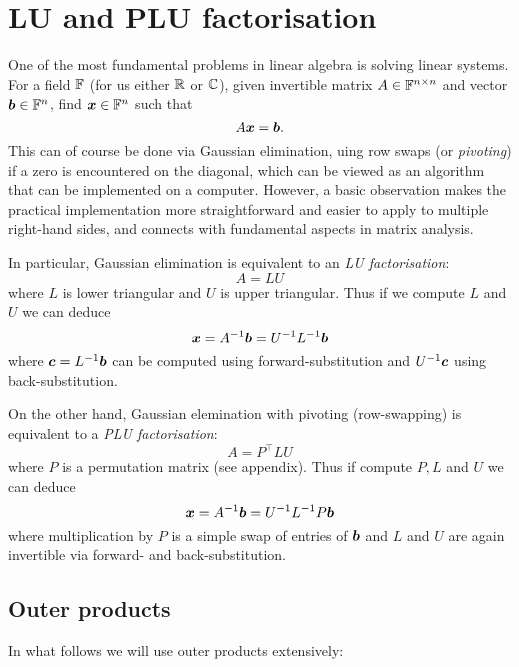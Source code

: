 
\section{LU and PLU factorisation}
One of the most fundamental problems in linear algebra is solving linear systems. For a field ${\mathbb F}$ (for us either ${\mathbb R}$ or ${\mathbb C}$), given invertible matrix $A\in {\mathbb F}^{n \times n}$ and vector $\bm{{\mbox{\boldmath$b$\unboldmath}}} \in {\mathbb F}^n$, find $\bm{{\mbox{\boldmath$x$\unboldmath}}} \in {\mathbb F}^n$ such that
\[
A \bm{{\mbox{\boldmath$x$\unboldmath}}} = \bm{{\mbox{\boldmath$b$\unboldmath}}}.
\]
This can of course be done via Gaussian elimination, uing row swaps (or \emph{pivoting}) if a zero is encountered on the diagonal, which can be viewed as an algorithm that can be implemented on a computer. However, a basic observation makes the practical implementation more straightforward and easier to apply to multiple right-hand sides, and connects with fundamental aspects in matrix analysis.

In particular, Gaussian elimination is equivalent to an \emph{LU factorisation}:
\[
A =L U
\]
where $L$ is lower triangular and $U$ is upper triangular. Thus if we compute $L$ and $U$ we can deduce
\[
\bm{{\mbox{\boldmath$x$\unboldmath}}} = A^{-1} \bm{{\mbox{\boldmath$b$\unboldmath}}}= U^{-1} L^{-1} \bm{{\mbox{\boldmath$b$\unboldmath}}}
\]
where  $\bm{{\mbox{\boldmath$c$\unboldmath}}} = L^{-1} \bm{{\mbox{\boldmath$b$\unboldmath}}}$ can be computed using forward-substitution and $U^{-1} \bm{{\mbox{\boldmath$c$\unboldmath}}}$ using back-substitution.

On the other hand, Gaussian elemination with pivoting (row-swapping) is equivalent to a \emph{PLU factorisation}:
\[
A = P^\ensuremath{\top} LU
\]
where $P$ is a permutation matrix (see appendix). Thus if compute $P, L$ and $U$ we can deduce
\[
\bm{{\mbox{\boldmath$x$\unboldmath}}} = A^{-1} \bm{{\mbox{\boldmath$b$\unboldmath}}}= U^{-1} L^{-1} P \bm{{\mbox{\boldmath$b$\unboldmath}}}
\]
where multiplication by $P$ is a simple swap of entries of $\bm{{\mbox{\boldmath$b$\unboldmath}}}$ and $L$ and $U$ are again invertible via forward- and back-substitution.

\subsection{Outer products}
In what follows we will use outer products extensively:

